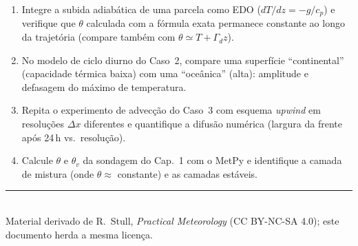 \documentclass[11pt]{article}
\begin{document}
\begin{enumerate}[label=\textbf{N\arabic*.},itemsep=4pt]
  \item Integre a subida adiabática de uma parcela como EDO
        ($dT/dz = -g/c_p$) e verifique que $\theta$ calculada com a
        fórmula exata permanece constante ao longo da trajetória (compare
        também com $\theta \simeq T+\Gamma_d z$).
  \item No modelo de ciclo diurno do Caso~2, compare uma superfície
        ``continental'' (capacidade térmica baixa) com uma ``oceânica''
        (alta): amplitude e defasagem do máximo de temperatura.
  \item Repita o experimento de advecção do Caso~3 com esquema
        \emph{upwind} em resoluções $\Delta x$ diferentes e quantifique a
        difusão numérica (largura da frente após 24\,h vs.\ resolução).
  \item Calcule $\theta$ e $\theta_v$ da sondagem do Cap.~1 com o MetPy e
        identifique a camada de mistura (onde $\theta \approx$ constante)
        e as camadas estáveis.
\end{enumerate}

\vspace{1em}
\noindent\rule{\linewidth}{0.4pt}\\
{\scriptsize Material derivado de R.~Stull, \emph{Practical Meteorology}
(CC BY-NC-SA 4.0); este documento herda a mesma licença.}
\end{document}
